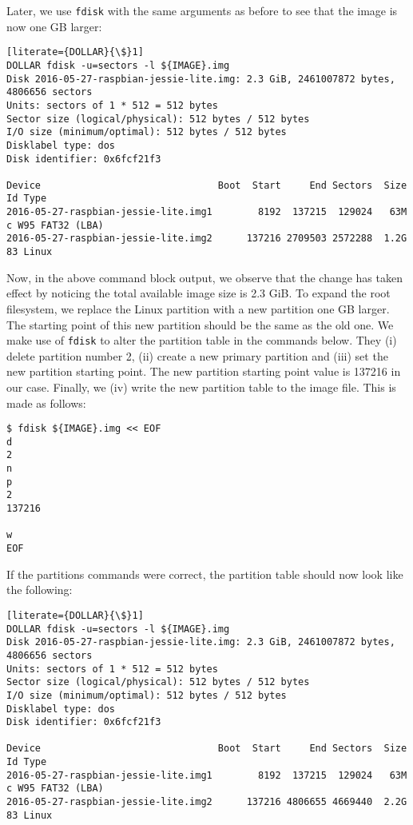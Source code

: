 Later, we use \texttt{fdisk} with the same arguments as before to see that
the image is now one GB larger:
\begin{lstlisting}[literate={DOLLAR}{\$}1]
DOLLAR fdisk -u=sectors -l ${IMAGE}.img
Disk 2016-05-27-raspbian-jessie-lite.img: 2.3 GiB, 2461007872 bytes, 4806656 sectors
Units: sectors of 1 * 512 = 512 bytes
Sector size (logical/physical): 512 bytes / 512 bytes
I/O size (minimum/optimal): 512 bytes / 512 bytes
Disklabel type: dos
Disk identifier: 0x6fcf21f3

Device                               Boot  Start     End Sectors  Size Id Type
2016-05-27-raspbian-jessie-lite.img1        8192  137215  129024   63M  c W95 FAT32 (LBA)
2016-05-27-raspbian-jessie-lite.img2      137216 2709503 2572288  1.2G 83 Linux
\end{lstlisting}
\FloatBarrier
\vspace{-5mm}

Now, in the above command block output, we observe that the change has taken
effect by noticing the total available image size is 2.3 GiB. To expand the
root filesystem, we replace the Linux partition with a new partition one GB
larger. The starting point of this new partition should be the same as the old
one. We make use of \texttt{fdisk} to alter the partition table
in the commands below. They (i) delete partition number 2, (ii) create a new
primary partition and (iii) set the new partition starting point. The new
partition starting point value is 137216 in our case. Finally, we (iv) write
the new partition table to the image file. This is made as follows:

\begin{lstlisting}[]
$ fdisk ${IMAGE}.img << EOF
d
2
n
p
2
137216

w
EOF
\end{lstlisting}
\FloatBarrier
\vspace{-5mm}

If the partitions commands were correct, the partition table should now
look like the following:
\begin{lstlisting}[literate={DOLLAR}{\$}1]
DOLLAR fdisk -u=sectors -l ${IMAGE}.img
Disk 2016-05-27-raspbian-jessie-lite.img: 2.3 GiB, 2461007872 bytes, 4806656 sectors
Units: sectors of 1 * 512 = 512 bytes
Sector size (logical/physical): 512 bytes / 512 bytes
I/O size (minimum/optimal): 512 bytes / 512 bytes
Disklabel type: dos
Disk identifier: 0x6fcf21f3

Device                               Boot  Start     End Sectors  Size Id Type
2016-05-27-raspbian-jessie-lite.img1        8192  137215  129024   63M  c W95 FAT32 (LBA)
2016-05-27-raspbian-jessie-lite.img2      137216 4806655 4669440  2.2G 83 Linux
\end{lstlisting}
\FloatBarrier
\vspace{-5mm}

